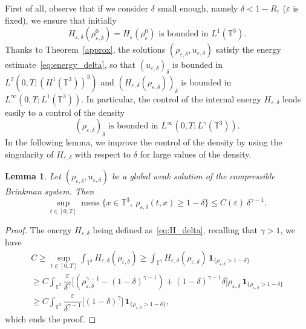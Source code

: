 \documentclass[JEP,XML,SOM,Unicode,NoEqCountersInSection]{cedram}
\newcommand{\<}{\bigl\langle}
\renewcommand{\>}{\bigr\rangle}
\DeclareMathOperator{\meas}{meas}
\newcommand{\labeleq}[1]{}
\newtheorem{lem}[thm]{Lemma}
\theoremstyle{definition}
\theoremstyle{remark}
\newcommand{\TT}{\mathbb{T}^3}
\let\ep\varepsilon
\begin{document}
First of all, observe that if we consider $\delta$ small enough, namely $\delta < 1-R_\ep$ ($\ep$ is fixed), we ensure that initially
\[
H_{\ep,\delta}(\rho_{\ep,\delta}^0) = H_{\ep}(\rho_{\ep}^0) \text{ is bounded in } L^1(\TT).
\]
Thanks to Theorem~\ref{approx}, the solutions $(\rho_{\ep,\delta},u_{\ep,\delta})$ satisfy the energy estimate~\eqref{eq:energy_delta}, so that $(u_{\ep,\delta})_\delta$ is bounded in $L^2(0,T;(H^1(\TT))^3)$
and $(H_{\ep,\delta}(\rho_{\ep,\delta}))_\delta$ is bounded in $L^\infty(0,T;L^1(\TT))$.
In particular, the control of the internal energy $H_{\ep,\delta}$ leads easily to a control of the density\vspace*{-3pt}
\begin{equation*}\labeleq{bound-rd-Lgamma}
(\rho_{\ep,\delta})_\delta \text{ is bounded in } L^{\infty}(0,T;L^\gamma(\TT)).
\end{equation*}
In the following lemma, we improve the control of the density by using the singularity of $H_{\ep,\delta}$ with respect to $\delta$ for large values of the density.
\begin{lem}\label{lem:meas_largerho_delta}
Let $(\rho_{\varepsilon, \delta}, u_{\varepsilon,\delta})$ be a global weak solution
of the compressible Brinkman system. Then\vspace*{-3pt}
\begin{equation}\label{eq:est-rhodelta}
\sup_{t\in [0,T]} \meas \big\{ x\in \TT, \ \rho_{\ep,\delta}(t,x) \geq 1-\delta \big\} \leq C(\ep) \ \delta^{\gamma -1}.
\end{equation}
\end{lem}

\begin{proof} The energy $H_{\ep,\delta}$ being defined as~\eqref{eq:H_delta}, recalling that $\gamma>1$, we have\vspace*{-3pt}
\begin{multline} \label{eq:ineg-Hdelta}
C \geq \sup_{t\in [0,T]} \int_{\TT}{H_{\ep,\delta}(\rho_{\ep,\delta})}
\geq \int_{\TT}{H_{\ep,\delta}(\rho_{\ep,\delta}) \,\mathbf{1}_{\{ \rho_{\ep,\delta} > 1-\delta \}}} \\[-2pt]
\geq C\int_{\TT}{\dfrac{\ep}{\delta^\gamma}\bigl[
(\rho_{\varepsilon,\delta}^{\gamma-1} - (1-\delta)^{\gamma-1})
+ (1-\delta)^{\gamma-1}\delta \bigr] \rho_{\ep,\delta}
\,\mathbf{1}_{\{ \rho_{\ep,\delta} > 1-\delta \}}} \\[-3pt]
\geq C\int_{\TT}{\dfrac{\ep}{\delta^{\gamma-1} }\bigl[
(1-\delta)^{\gamma} \bigr]
\,\mathbf{1}_{\{ \rho_{\ep,\delta} > 1-\delta \}}},
\end{multline}
which ends the proof.
\end{proof}
\end{document}
